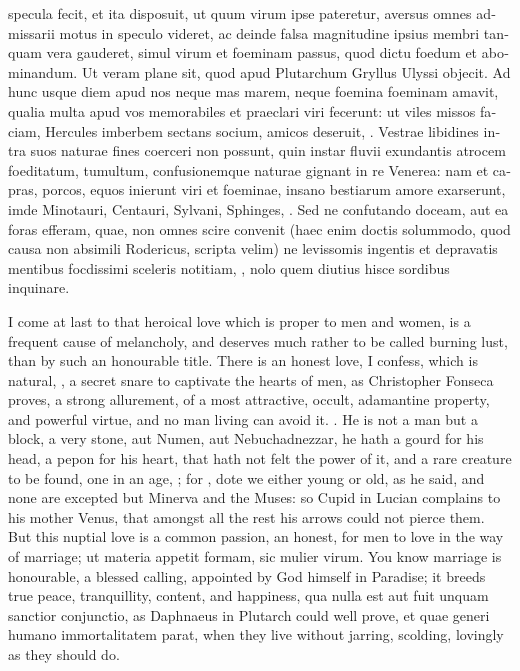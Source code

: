 \begin{latin}
specula fecit, et ita disposuit, ut quum virum ipse pateretur, aversus
omnes admissarii motus in speculo videret, ac deinde falsa magnitudine
ipsius membri tanquam vera gauderet, simul virum et foeminam passus,
quod dictu foedum et abominandum. Ut veram plane sit, quod apud
Plutarchum Gryllus Ulyssi objecit. Ad hunc usque diem apud nos
neque mas marem, neque foemina foeminam amavit, qualia multa apud vos
memorabiles et praeclari viri fecerunt: ut viles missos faciam,
Hercules imberbem sectans socium, amicos deseruit, \etc{}. Vestrae
libidines intra suos naturae fines coerceri non possunt, quin instar
fluvii exundantis atrocem foeditatum, tumultum, confusionemque naturae
gignant in re Venerea: nam et capras, porcos, equos inierunt viri et
foeminae, insano bestiarum amore exarserunt, imde Minotauri, Centauri,
Sylvani, Sphinges, \etc{}. Sed ne confutando doceam, aut ea foras efferam,
quae, non omnes scire convenit (haec enim doctis solummodo, quod causa
non absimili Rodericus, scripta velim) ne levissomis ingentis et
depravatis mentibus focdissimi sceleris notitiam, \etc{}, nolo quem
diutius hisce sordibus inquinare.
\end{latin}

I come at last to that heroical love which is proper to men and women,
is a frequent cause of melancholy, and deserves much rather to be
called burning lust, than by such an honourable title. There is an
honest love, I confess, which is natural, , a secret snare to
captivate the hearts of men, as Christopher Fonseca proves, a
strong allurement, of a most attractive, occult, adamantine property,
and powerful virtue, and no man living can avoid it. . He is not a man but a
block, a very stone, aut Numen, aut Nebuchadnezzar, he hath a
gourd for his head, a pepon for his heart, that hath not felt the power
of it, and a rare creature to be found, one in an age, ; for , dote
we either young or old, as he said, and none are excepted but
Minerva and the Muses: so Cupid in Lucian complains to his mother
Venus, that amongst all the rest his arrows could not pierce them. But
this nuptial love is a common passion, an honest, for men to love in
the way of marriage; ut materia appetit formam, sic mulier virum.
You know marriage is honourable, a blessed calling, appointed by
God himself in Paradise; it breeds true peace, tranquillity, content,
and happiness, qua nulla est aut fuit unquam sanctior conjunctio, as
Daphnaeus in Plutarch could well prove, et quae generi humano
immortalitatem parat, when they live without jarring, scolding,
lovingly as they should do.

